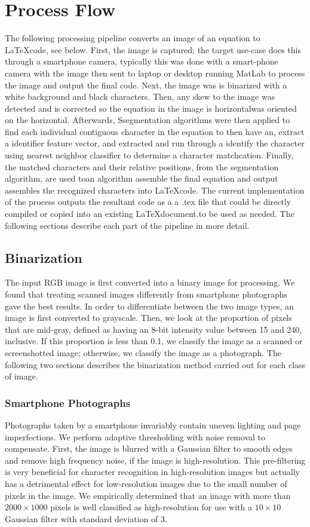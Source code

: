 \documentclass[journal]{IEEEtran}
\begin{document}
\section{Process Flow}
The following processing pipeline converts an image of an equation to \LaTeX code, see below. First, the image is captured; the target use-case does this through a smartphone camera, typically this was done with a smart-phone camera with the image then sent to laptop or desktop running MatLab to process the image and output the final code. Next, the image was is binarized with a white background and black characters. Then, any  skew to the image was detected and is corrected so the equation  in the image is horizontalwas oriented on the horizontal. Afterwards, Ssegmentation algorithms were then applied to find each individual contiguous character in the equation to then have an, extract a identifier feature vector, and extracted and run through a identify the character using nearest neighbor classifier to determine a character matchcation. Finally, the matched characters and their relative positions, from the segmentation algorithm, are used toan algorithm  assemble the final equation and output assembles the recognized characters into \LaTeX code. The current implementation of the process outputs the resultant code as a a .tex file that could be directly compiled or copied into an existing \LaTeX document.to be used as needed.
The following sections describe each part of the pipeline in more detail.

\subsection{Binarization}
The input RGB image is first converted into a binary image for processing. We found that treating scanned images differently from smartphone photographs gave the best results. In order to differentiate between the two image types, an image is first converted to grayscale. Then, we look at the proportion of pixels that are mid-gray, defined as having an 8-bit intensity value between 15 and 240, inclusive. If this proportion is less than 0.1, we classify the image as a scanned or screenshotted image; otherwise, we classify the image as a photograph. The following two sections describes the binarization method carried out for each class of image.
\subsubsection{Smartphone Photographs}
Photographs taken by a smartphone invariably contain uneven lighting and page imperfections. We perform adaptive thresholding with noise removal to compensate. First, the image is blurred with a Gaussian filter to smooth edges and remove high frequency noise, if the image is high-resolution. This pre-filtering is very beneficial for character recognition in high-resolution images but actually has a detrimental effect for low-resolution images due to the small number of pixels in the image. We empirically determined that an image with more than $2000\times1000$ pixels is well classified as high-resolution for use with a $10\times10$ Gaussian filter with standard deviation of $3$.
\end{document}
